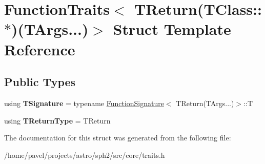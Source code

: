 \hypertarget{structFunctionTraits_3_01TReturn_07TClass_1_1_5_08_07TArgs_8_8_8_08_4}{}\section{Function\+Traits$<$ T\+Return(T\+Class\+:\+:$\ast$)(T\+Args...)$>$ Struct Template Reference}
\label{structFunctionTraits_3_01TReturn_07TClass_1_1_5_08_07TArgs_8_8_8_08_4}
\subsection*{Public Types}
\begin{DoxyCompactItemize}
\item 
\hypertarget{structFunctionTraits_3_01TReturn_07TClass_1_1_5_08_07TArgs_8_8_8_08_4_a85d9a0615c88aceb9940157567bfb5d9}{}\label{structFunctionTraits_3_01TReturn_07TClass_1_1_5_08_07TArgs_8_8_8_08_4_a85d9a0615c88aceb9940157567bfb5d9} 
using {\bfseries T\+Signature} = typename \hyperlink{structFunctionSignature}{Function\+Signature}$<$ T\+Return(T\+Args...)$>$\+::T
\item 
\hypertarget{structFunctionTraits_3_01TReturn_07TClass_1_1_5_08_07TArgs_8_8_8_08_4_afb75119740cff4ca49102552cf04bc8d}{}\label{structFunctionTraits_3_01TReturn_07TClass_1_1_5_08_07TArgs_8_8_8_08_4_afb75119740cff4ca49102552cf04bc8d} 
using {\bfseries T\+Return\+Type} = T\+Return
\end{DoxyCompactItemize}


The documentation for this struct was generated from the following file\+:\begin{DoxyCompactItemize}
\item 
/home/pavel/projects/astro/sph2/src/core/traits.\+h\end{DoxyCompactItemize}
